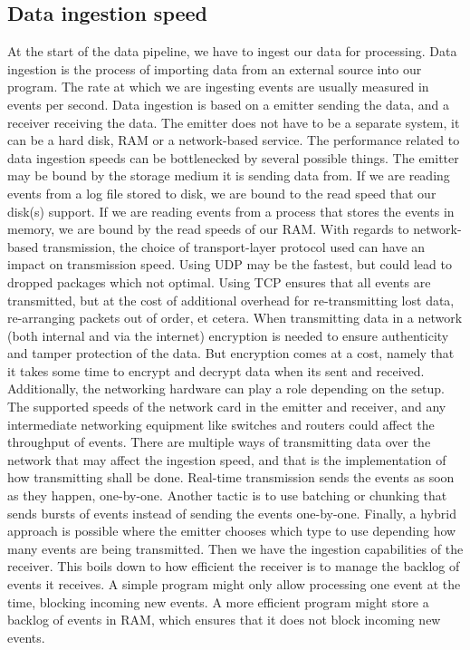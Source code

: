 \subsection{Data ingestion speed}
\label{sub:ingestion-speed}

At the start of the data pipeline, we have to ingest our data for processing. Data ingestion is the process of importing data from an external source into our program. The rate at which we are ingesting events are usually measured in events per second.
Data ingestion is based on a emitter sending the data, and a receiver receiving the data. The emitter does not have to be a separate system, it can be a hard disk, RAM or a network-based service. 
The performance related to data ingestion speeds can be bottlenecked by several possible things. The emitter may be bound by the storage medium it is sending data from. If we are reading events from a log file stored to disk, we are bound to the read speed that our disk(s) support. If we are reading events from a process that stores the events in memory, we are bound by the read speeds of our RAM.
With regards to network-based transmission, the choice of transport-layer protocol used can have an impact on transmission speed. Using UDP may be the fastest, but could lead to dropped packages which not optimal. Using TCP ensures that all events are transmitted, but at the cost of additional overhead for re-transmitting lost data, re-arranging packets out of order, et cetera. When transmitting data in a network (both internal and via the internet) encryption is needed to ensure authenticity and tamper protection of the data. But encryption comes at a cost, namely that it takes some time to encrypt and decrypt data when its sent and received.
Additionally, the networking hardware can play a role depending on the setup. The supported speeds of the network card in the emitter and receiver, and any intermediate networking equipment like switches and routers could affect the throughput of events.
There are multiple ways of transmitting data over the network that may affect the ingestion speed, and that is the implementation of how transmitting shall be done. Real-time transmission sends the events as soon as they happen, one-by-one. Another tactic is to use batching or chunking that sends bursts of events instead of sending the events one-by-one. Finally, a hybrid approach is possible where the emitter chooses which type to use depending how many events are being transmitted.
Then we have the ingestion capabilities of the receiver. This boils down to how efficient the receiver is to manage the backlog of events it receives. A simple program might only allow processing one event at the time, blocking incoming new events. A more efficient program might store a backlog of events in RAM, which ensures that it does not block incoming new events.

